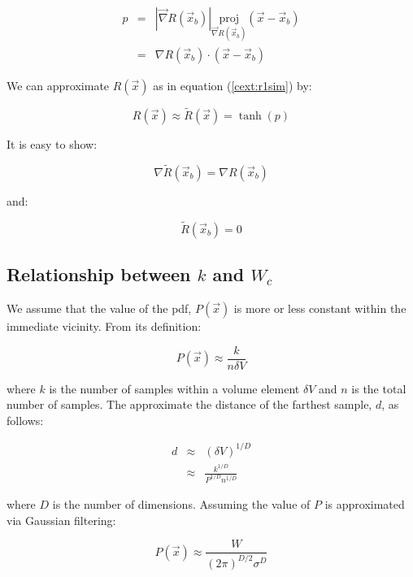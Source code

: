 \documentclass[12pt]{report}
\begin{document}
\begin{flushleft}
\begin{eqnarray}
p & = & |\vec \nabla R(\vec x_b)| \underset{\vec \nabla R(\vec x_b)} {\mathrm{proj}} (\vec x - \vec x_b) \\
  & = & \nabla R(\vec x_b) \cdot (\vec x - \vec x_b)
\end{eqnarray}

We can approximate $R(\vec x)$ as in equation (\ref{cext:r1sim}) by:

\begin{equation}
R(\vec x) \approx \tilde R(\vec x) = \tanh(p)
\end{equation}

It is easy to show:

\begin{equation}
\nabla \tilde R(\vec x_b) = \nabla R(\vec x_b)
\end{equation}

and:

\begin{equation}
\tilde R(\vec x_b) = 0
\end{equation}

\subsection{Relationship between $k$ and $W_c$}

We assume that the value of the pdf, $P(\vec x)$ is more or less constant within
the immediate vicinity.  From its definition:

\begin{equation}
P(\vec x) \approx \frac{k}{n\delta V}
\end{equation}

where $k$ is the number of samples within a volume element $\delta V$ and $n$ is the
total number of samples.  The approximate the distance of the farthest sample, $d$,
as follows:

\begin{eqnarray}
d & \approx & (\delta V)^{1/D} \\
	& \approx & \frac{k^{1/D}} {P^{1/D} n^{1/D}}
\label{kvwc:pknn}
\end{eqnarray}

where $D$ is the number of dimensions.  Assuming the value of $P$ is approximated via
Gaussian filtering:

\begin{equation}
P(\vec x) \approx \frac{W}{(2\pi)^{D/2}\sigma^{D}}
\label{kvwc:pgauss}
\end{equation}


\end{flushleft}
\end{document}
